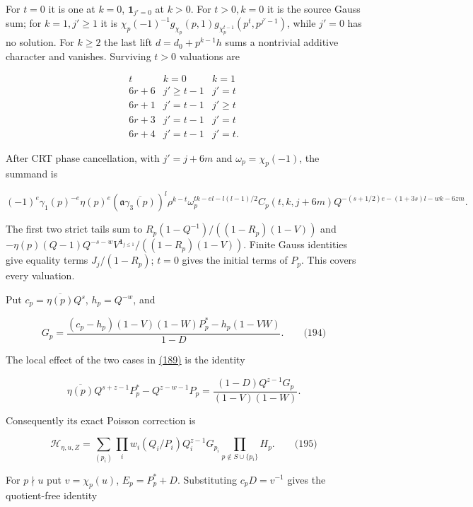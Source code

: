 For \(t=0\) it is one at \(k=0\), \(\mathbf1_{j'=0}\) at \(k>0\). For \(t>0,k=0\) it is the source Gauss sum; for \(k=1,j'\ge1\) it is \(\chi_p(-1)^{-1}g_{\chi_p}(p,1)g_{\chi_p^{t-1}}(p^t,p^{j'-1})\), while \(j'=0\) has no solution. For \(k\ge2\) the last lift \(d=d_0+p^{k-1}h\) sums a nontrivial additive character and vanishes. Surviving \(t>0\) valuations are

\[
\begin{array}{c|cc}
 t&k=0&k=1\\ \hline
 6r+6&j'\ge t-1&j'=t\\
 6r+1&j'=t-1&j'\ge t\\
 6r+3&j'=t-1&j'=t\\
 6r+4&j'=t-1&j'=t.
\end{array}
\]

After CRT phase cancellation, with \(j'=j+6m\) and \(\omega_p=\chi_p(-1)\), the summand is

\[
(-1)^e\gamma_1(p)^{-e}\eta(p)^e
 (\mathfrak a\overline{\gamma_3(p)})^l
 \rho^{k-t}\omega_p^{tk-el-l(l-1)/2}C_p(t,k,j+6m)
 Q^{-(s+1/2)e-(1+3s)l-wk-6zm}.
\]

The first two strict tails sum to \(R_p(1-Q^{-1})/((1-R_p)(1-V))\) and \(-\eta(p)(Q-1)Q^{-s-w}V^{\mathbf1_{j\le1}}/((1-R_p)(1-V))\). Finite Gauss identities give equality terms \(J_j/(1-R_p)\); \(t=0\) gives the initial terms of \(P_p\). This covers every valuation.

Put \(c_p=\overline{\eta(p)}Q^s\), \(h_p=Q^{-w}\), and

\hypertarget{dr:G}{}

\label{dr:G}

\[
G_p=\frac{(c_p-h_p)(1-V)(1-W)P_p^*-h_p(1-VW)}{1-D}.
 \qquad\text{(194)}
\]

The local effect of the two cases in \protect\hyperlink{dr:comp}{(189)} is the identity

\[
\overline{\eta(p)}Q^{s+z-1}P_p^*-Q^{z-w-1}P_p
 =\frac{(1-D)Q^{z-1}G_p}{(1-V)(1-W)}.
\]

Consequently its exact Poisson correction is

\hypertarget{dr:Hcomp}{}

\label{dr:Hcomp}

\[
\mathcal H_{\eta,u,Z}=
 \sum_{(p_i)}\prod_iw_i(Q_i/P_i)Q_i^{z-1}G_{p_i}
 \prod_{p\notin S\cup\{p_i\}}H_p.
 \qquad\text{(195)}
\]

For \(p\nmid u\) put \(v=\chi_p(u)\), \(E_p=P_p^*+D\). Substituting \(c_pD=v^{-1}\) gives the quotient-free identity

